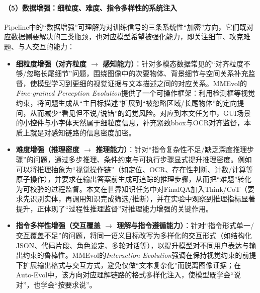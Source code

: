 \paragraph{（5）数据增强：细粒度、难度、指令多样性的系统注入}
Pipeline中的“数据增强”可理解为对训练信号的三条系统性“加密”方向，它们既对应数据侧要解决的三类瓶颈，也对应模型希望被强化能力，即关注细节、攻克难题、与人交互的能力：
\begin{itemize}
  \item \textbf{细粒度增强（对齐粒度 $\rightarrow$ 感知能力）}：针对多模态数据常见的“对齐粒度不够/忽略长尾细节”问题，围绕图像中的次要物体、背景细节与空间关系补充监督，使模型学习到更细的视觉证据与文本描述之间的对应关系。MMEvol的\emph{Fine-grained Perception Evolution}提供了一个可操作框架\citep{xu2024mmevol}：利用检测框等视觉约束，将问题生成从“主目标描述”扩展到“被忽略区域/长尾物体”的定向提问，从而减少“看见但不说/说错”的幻觉风险。对应到本文任务中，GUI场景的小控件与小字体天然属于细粒度信息，补充紧致bbox与OCR对齐监督，本质上就是对感知链路的信息密度加密。
  \item \textbf{难度增强（推理密度 $\rightarrow$ 推理能力）}：针对“指令复杂性不足/缺乏深度推理步骤”的问题，通过多步推理、条件约束与可执行步骤显式提升推理密度。例如可以将推理抽象为“视觉操作链”（如定位、OCR、存在性判断、计数/计算等原子操作），并要求在输出答案前生成可追踪的推理步骤，从而把“难题”转化为可校验的过程监督。本文在世界知识任务中对FinalQA加入Think/CoT（要求先识别实体，再调用知识完成筛选/推断），并在实验中观察到推理指标显著提升，正体现了“过程性推理监督”对推理能力增强的关键作用。
  \item \textbf{指令多样性增强（交互覆盖 $\rightarrow$ 理解与指令遵循能力）}：针对“指令形式单一/交互覆盖不足”的问题，将同一语义目标改写为多样化的交互形式（如结构化JSON、代码片段、角色设定、多轮对话等），以提升模型对不同用户表达与输出约束的鲁棒性。MMEvol的\emph{Interaction Evolution}强调在保持视觉约束的前提下扩展输出格式与交互方式\citep{xu2024mmevol}，避免仅做“文本复杂化”而脱离图像证据；在Auto-Evol中，该方向对应理解链路的格式多样化注入，使模型既学会“说对”，也学会“按要求说”。
\end{itemize}

